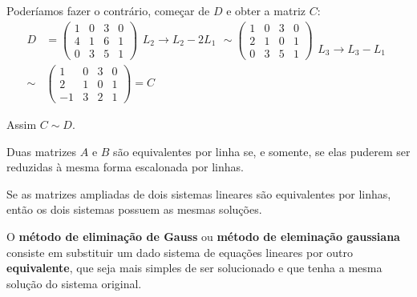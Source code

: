 \begin{exemplos}
\begin{enumerate}[label={\arabic*})]
            Poderíamos fazer o contrário, começar de $D$ e obter a matriz $C$:
            \begin{align*}
                D &= \begin{pmatrix}
                    1 & 0 & 3 & 0\\
                    4 & 1 & 6 & 1\\
                    0 & 3 & 5 & 1
                \end{pmatrix}
                \begin{array}{l}
                    \phantom{x}\\ L_2 \to L_2 - 2L_1\\\phantom{x}
                \end{array} \sim
                \begin{pmatrix}
                    1 & 0 & 3 & 0\\
                    2 & 1 & 0 & 1\\
                    0 & 3 & 5 & 1
                \end{pmatrix}
                \begin{array}{l}
                    \phantom{x}\\ \phantom{x}\\ L_3 \to L_3 - L_1
                \end{array}\\ \sim
                  &\begin{pmatrix}
                    1 & 0 & 3 & 0\\
                    2 & 1 & 0 & 1\\
                    -1 & 3 & 2 & 1
                \end{pmatrix} = C
            \end{align*}

            Assim $C \sim D$.
    \end{enumerate}
\end{exemplos}
\begin{teorema}
    Duas matrizes $A$ e $B$ são equivalentes por linha se, e somente, se elas puderem ser reduzidas à mesma forma escalonada por linhas.
\end{teorema}

\begin{teorema}
    Se as matrizes ampliadas de dois sistemas lineares são equivalentes por linhas, então os dois sistemas possuem as mesmas soluções.
\end{teorema}

O \textbf{método de eliminação de Gauss} ou \textbf{método de eleminação gaussiana} consiste em substituir um dado sistema de equações lineares  por outro \textbf{equivalente}, que seja mais simples de ser solucionado e que tenha a mesma solução do sistema original.

